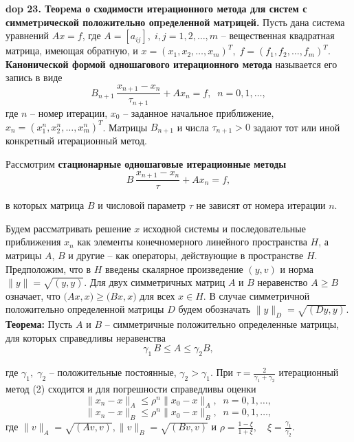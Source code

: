 \textbf{\LARGE dop 23. Теоpема о сходимости итеpационного метода для систем с симметpической положительно   опpеделенной матpицей.}
\setcounter{equation}{0}
Пусть дана система уравнений $A x = f$,
где $A = [a_{ij}], \; i, j = 1,2,\ldots, m$ -- вещественная квадратная матрица, имеющая обратную, и $x = (x_1, x_2, \ldots, x_m)^T, \; f = (f_1, f_2, \ldots, f_m)^T$. \textbf{Канонической формой одношагового итерационного метода} называется его запись в виде 
$$
B_{n+1}\, \frac{x_{n+1} - x_{n}}{\tau_{n+1}} + A x_n = f, \;\; n = 0, 1, \ldots,
$$
где $n$ -- номер итерации, $x_0$ -- заданное начальное приближение, $x_n = (x_1^n, x_2^n, \ldots, x_m^n)^T$. Матрицы $B_{n+1}$ и числа $\tau_{n+1} > 0$ задают тот или иной конкретный итерационный метод.

Рассмотрим \textbf{стационарные одношаговые итерационные методы}
\begin{equation}
    B\, \frac{x_{n+1} - x_{n}}{\tau} + A x_n = f, 
    \tag{2}
\end{equation}

в которых матрица $B$ и числовой параметр $\tau$ не зависят от номера итерации $n$.

Будем рассматривать решение $x$ исходной системы  и последовательные приближения $x_n$ как элементы конечномерного линейного пространства $H$, а матрицы $A$, $B$ и другие -- как операторы, действующие в пространстве $H$. 
Предположим, что в $H$ введены скалярное произведение $(y, v)$ и норма $\|y\| = \sqrt{(y, y)}$. 
Для двух симметричных матриц $A$ и $B$ неравенство $A \geq B$ означает, что $\big(A x, x\big) \geq \big(B x, x\big)$ для всех $x \in H$. 
В случае симметричной положительно определенной матрицы $D$ будем обозначать $\|y\|_D = \sqrt{(D y , y)}$.\\

\textbf{Теорема:\;} Пусть $A$ и $B$ -- симметричные положительно определенные матрицы, для которых справедливы неравенства
\begin{equation}\tag{3}
    \gamma_1 \,B \leq A \leq \gamma_2 B,
\end{equation}

где $\gamma_1, \;\gamma_2$ -- положительные постоянные, $\gamma_2 > \gamma_1$. При 
$
\tau = \frac{2}{\gamma_1 + \gamma_2}
$ 
итерационный метод (2) сходится и для погрешности справедливы оценки 
$$
\|x_n - x\|_A \leq \rho^n \|x_0 - x\|_A, \;\; n = 0, 1, \ldots,
$$
$$
\|x_n - x\|_B \leq \rho^n \|x_0 - x\|_B, \;\; n = 0, 1, \ldots,
$$
где $\|v\|_A = \sqrt{(A v, v)}, \|v\|_B = \sqrt{(B v, v)}$\; и 
$
\rho = \frac{1 - \xi}{1 + \xi}, \quad \xi = \frac{\gamma_1}{\gamma_2}.
$


